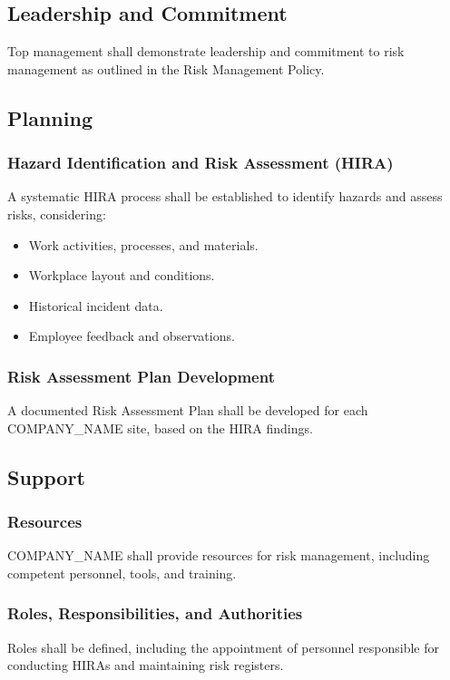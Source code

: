 \documentclass[12pt]{article}
\begin{document}
\subsection{Leadership and Commitment}
Top management shall demonstrate leadership and commitment to risk management as outlined in the Risk Management Policy.

\subsection{Planning}

\subsubsection{Hazard Identification and Risk Assessment (HIRA)}
A systematic HIRA process shall be established to identify hazards and assess risks, considering:
\begin{itemize}
    \item Work activities, processes, and materials.
    \item Workplace layout and conditions.
    \item Historical incident data.
    \item Employee feedback and observations.
\end{itemize}

\subsubsection{Risk Assessment Plan Development}
A documented Risk Assessment Plan shall be developed for each {{COMPANY_NAME}} site, based on the HIRA findings.

\subsection{Support}

\subsubsection{Resources}
{{COMPANY_NAME}} shall provide resources for risk management, including competent personnel, tools, and training.

\subsubsection{Roles, Responsibilities, and Authorities}
Roles shall be defined, including the appointment of personnel responsible for conducting HIRAs and maintaining risk registers.
\end{document}
